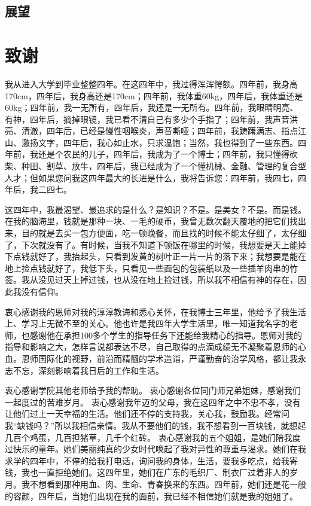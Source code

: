 \documentclass[a4paper,zihao=-4,UTF8]{ctexart}
\numberwithin{equation}{section}
\newcommand{\bold}[2][0.3]{\setBold[#1]#2\unsetBold}
\begin{document}
	\subsection{展望}

\fancyhf{}
\renewcommand{\headrulewidth}{0pt}

\newpage
{}
\printbibliography[heading=bibintoc,title={参考文献}]

\newpage
\section*{致谢}
我从进入大学到毕业整整四年。在这四年中，我过得浑浑愕额。四年前，我身高170cm，四年后，我身高还是170cm；四年前，我体重60kg，四年后，我体重还是60kg；四年前，我一无所有，四年后，我还是一无所有。四年前，我眼睛明亮、有神，四年后，摘掉眼镜，我已看不清自己有多少个手指了；四年前，我声音洪亮、清澈，四年后，已经是慢性咽喉炎，声音嘶哑；四年前，我踌躇满志、指点江山、激扬文字，四年后，我心如止水，只求温饱；当然，我也得到了一些东西。四年前，我还是个农民的儿子，四年后，我成为了一个博士；四年前，我只懂得砍柴、种田、割草、放牛，四年后，我已经成为了一个懂机械、金融、管理的复合型人才；但如果您问我这四年最大的长进是什么，我将告诉您：四年前，我四七，四年后，我二四七。

这四年中，我最渴望、最追求的是什么？是知识？不是。是美女？不是。而是钱。在我的脑海里，钱就是那种一块、一毛的硬币，我曾无数次翻天覆地的把它们找出来，目的就是去买一包方便面，吃一顿晚餐，而且找的时候不能太仔细了，太仔细了，下次就没有了。有时候，当我不知道下顿饭在哪里的时候，我想要是天上能掉下点钱就好了，我抬起头，只看到发黄的树叶正一片一片的落下来；我想要是能在地上捡点钱就好了，我低下头，只看见一些面包的包装纸以及一些插羊肉串的竹签。我从没见过天上掉过钱，也从没在地上捡过钱，所以我不相信有神的存在，因此我没有信仰。

衷心感谢我的恩师对我的淳淳教诲和悉心关怀，在我博士三年里，他给予了我生活上、学习上无微不至的关心。他也许是我四年大学生活里，唯一知道我名字的老师，也感谢他在承担100多个学生的指导任务下还能给我精心的指导。恩师对我的指导和影响之大，怎样言说都表达不尽，自己取得的点滴成绩无不凝聚着恩师的心血。恩师国际化的视野，前沿而精髓的学术造诣，严谨勤奋的治学风格，都让我永志不忘，深刻影响着我日后的工作和生活。

衷心感谢学院其他老师给予我的帮助。 衷心感谢各位同门师兄弟姐妹，感谢我们一起度过的苦难岁月。 衷心感谢我年迈的父母，我在这四年之中不忠不孝，没有让他们过上一天幸福的生活。他们还不停的支持我，关心我，鼓励我。经常问我“缺钱吗？”所以我相信亲情。我从不要他们的钱，我不想看到一百块钱，就想起几百个鸡蛋，几百担猪草，几千个红砖。 衷心感谢我的五个姐姐，是她们陪我度过快乐的童年。她们美丽纯真的少女时代唤起了我对异性的尊重与渴求。她们在我求学的四年中，不停的给我打电话，询问我的身体，生活，要我多吃点，给我寄钱，我也一直拒绝她们。这四年里，她们在广东的毛织厂、制衣厂过着非人的岁月。我不想看到那种用血、肉、生命、青春换来的东西。四年前，她们还是花一般的容颜，四年后，当她们出现在我的面前，我已经不相信她们就是我的姐姐了。
\end{document}
